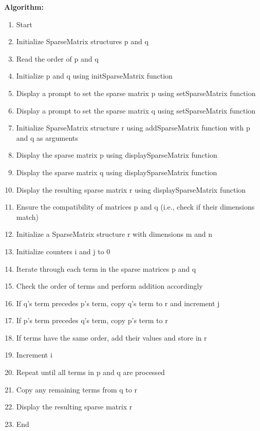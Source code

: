 \documentclass{article}
\begin{document}
\textbf{Algorithm:}
\begin{enumerate}
  \item Start
  \item Initialize SparseMatrix structures p and q
  \item Read the order of p and q
  \item Initialize p and q using initSparseMatrix function
  \item Display a prompt to set the sparse matrix p using setSparseMatrix function
  \item Display a prompt to set the sparse matrix q using setSparseMatrix function
  \item Initialize SparseMatrix structure r using addSparseMatrix function with p and q as arguments
  \item Display the sparse matrix p using displaySparseMatrix function
  \item Display the sparse matrix q using displaySparseMatrix function
  \item Display the resulting sparse matrix r using displaySparseMatrix function
  \item Ensure the compatibility of matrices p and q (i.e., check if their dimensions match)
  \item Initialize a SparseMatrix structure r with dimensions m and n
  \item Initialize counters i and j to 0
  \item Iterate through each term in the sparse matrices p and q
  \item Check the order of terms and perform addition accordingly
  \item If q's term precedes p's term, copy q's term to r and increment j
  \item If p's term precedes q's term, copy p's term to r
  \item If terms have the same order, add their values and store in r
  \item Increment i
  \item Repeat until all terms in p and q are processed
  \item Copy any remaining terms from q to r
  \item Display the resulting sparse matrix r
  \item End
\end{enumerate}
\end{document}
